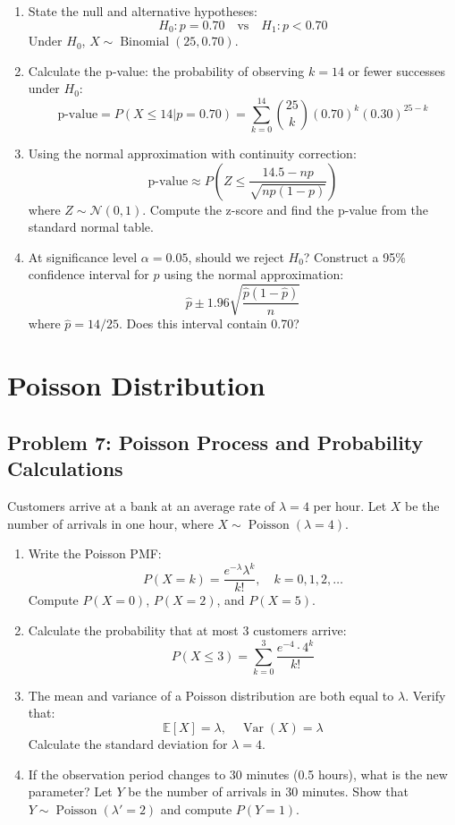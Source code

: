 \documentclass[12pt]{article}
\DeclareMathOperator{\Var}{Var}
\DeclareMathOperator{\Binom}{Binomial}
\DeclareMathOperator{\Pois}{Poisson}
\begin{document}
\begin{enumerate}[label=(\alph*)]
\item State the null and alternative hypotheses:
\[
H_0: p = 0.70 \quad \text{vs} \quad H_1: p < 0.70
\]
Under \(H_0\), \(X \sim \Binom(25, 0.70)\).

\item Calculate the p-value: the probability of observing \(k = 14\) or fewer successes under \(H_0\):
\[
\text{p-value} = P(X \leq 14 | p = 0.70) = \sum_{k=0}^{14} \binom{25}{k}(0.70)^k(0.30)^{25-k}
\]

\item Using the normal approximation with continuity correction:
\[
\text{p-value} \approx P\left(Z \leq \frac{14.5 - np}{\sqrt{np(1-p)}}\right)
\]
where \(Z \sim \mathcal{N}(0,1)\). Compute the z-score and find the p-value from the standard normal table.

\item At significance level \(\alpha = 0.05\), should we reject \(H_0\)? Construct a 95\% confidence interval for \(p\) using the normal approximation:
\[
\hat{p} \pm 1.96\sqrt{\frac{\hat{p}(1-\hat{p})}{n}}
\]
where \(\hat{p} = 14/25\). Does this interval contain 0.70?
\end{enumerate}


\section{Poisson Distribution}

\subsection*{Problem 7: Poisson Process and Probability Calculations}

Customers arrive at a bank at an average rate of \(\lambda = 4\) per hour. Let \(X\) be the number of arrivals in one hour, where \(X \sim \Pois(\lambda = 4)\).

\begin{enumerate}[label=(\alph*)]
\item Write the Poisson PMF:
\[
P(X = k) = \frac{e^{-\lambda}\lambda^k}{k!}, \quad k = 0, 1, 2, \ldots
\]
Compute \(P(X = 0)\), \(P(X = 2)\), and \(P(X = 5)\).

\item Calculate the probability that at most 3 customers arrive:
\[
P(X \leq 3) = \sum_{k=0}^{3} \frac{e^{-4} \cdot 4^k}{k!}
\]

\item The mean and variance of a Poisson distribution are both equal to \(\lambda\). Verify that:
\[
\mathbb{E}[X] = \lambda, \quad \Var(X) = \lambda
\]
Calculate the standard deviation for \(\lambda = 4\).

\item If the observation period changes to 30 minutes (0.5 hours), what is the new parameter? Let \(Y\) be the number of arrivals in 30 minutes. Show that \(Y \sim \Pois(\lambda' = 2)\) and compute \(P(Y = 1)\).
\end{enumerate}
\end{document}
